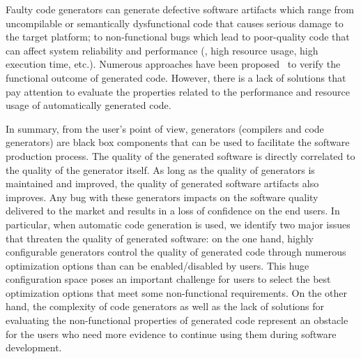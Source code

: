 Faulty code generators can generate defective software artifacts which range from uncompilable or semantically dysfunctional code that causes serious damage to the target platform; to non-functional bugs which lead to poor-quality code that can affect system reliability and performance (\eg, high resource usage, high execution time, etc.).
Numerous approaches have been proposed~\cite{stuermer2007systematic,yang2011finding} to verify the functional outcome of generated code. However, there is a lack of solutions that pay attention to evaluate the properties related to the performance and resource usage of automatically generated code. 



In summary, from the user's point of view, generators (compilers and code generators) are black box components that can be used to facilitate the software production process. The quality of the generated software is directly correlated to the quality of the generator itself. As long as the quality of generators is maintained and improved, the quality of generated software artifacts also improves. Any bug with these generators impacts on the software quality delivered to the market and results in a loss of confidence on the end users.
In particular, when automatic code generation is used, we identify two major issues that threaten the quality of generated software:
on the one hand, highly configurable generators control the quality of generated code through numerous optimization options than can be enabled/disabled by users. This huge configuration space poses an important challenge for users to select the best optimization options that meet some non-functional requirements.
On the other hand, the complexity of code generators as well as the lack of solutions for evaluating the non-functional properties of generated code represent an obstacle for the users who need more evidence to continue using them during software development. 



